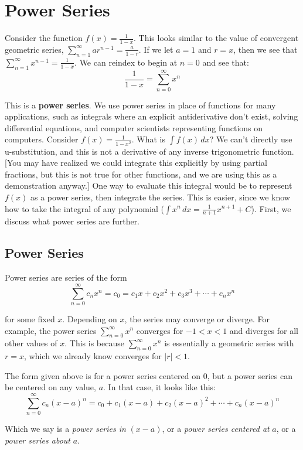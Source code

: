 \chapter{Power Series}

Consider the function $f(x) = \frac{1}{1-x}$. This looks similar to the value 
of convergent geometric series, $\sum_{n=1}^\infty ar^{n-1} = \frac{a}{1-r}$. 
If we let $a = 1$ and $r = x$, then we see that $\sum_{n=1}^\infty x^{n-1} = 
\frac{1}{1-x}$. We can reindex to begin at $n=0$ and see that:
$$\frac{1}{1-x} = \sum_{n=0}^\infty x^n$$

This is a \textbf{power series}. We use power series in place of functions for many 
applications, such as integrals where an explicit antiderivative don't exist, solving 
differential equations, and computer scientists representing functions on 
computers. Consider $f(x) = \frac{1}{1-x^2}$. What is $\int 
f(x)\,dx$? We can't directly use u-substitution, and this is not a derivative of 
any inverse trigonometric function. [You may have realized we could integrate 
this explicitly by using partial fractions, but this is not true for other 
functions, and we are using this as a demonstration anyway.] One way to 
evaluate this integral would be to represent $f(x)$ as a power series, then 
integrate the series. This is easier, since we know how to take the integral 
of any polynomial ($\int x^n\,dx = \frac{1}{n+1}x^{n+1} + C$). First, we 
discuss what power series are further.

\section{Power Series}
Power series are series of the form 
$$\sum_{n=0}^\infty c_n x^n = c_0 = c_1 x + c_2 x^2 + c_3 x^3 + \cdots + c_n 
x^n$$

for some fixed $x$. Depending on $x$, the series may converge or diverge. For 
example, the power series $\sum_{n=0}^\infty x^n$ converges for $ -1 < x < 1$ 
and diverges for all other values of $x$. This is because $\sum_{n=0}^\infty 
x^n$ is essentially a geometric series with $r = x$, which we already know 
converges for $|r|<1$. 

The form given above is for a power series centered on $0$, but a power series 
can be centered on any value, $a$. In that case, it looks like this:
$$\sum_{n=0}^\infty c_n (x - a)^n = c_0 + c_1(x - a) + c_2(x - a)^2 + \cdots + 
c_n(x - a)^n$$

Which we say is a \textit{power series in }$(x - a)$, or a \textit{power 
series centered at }$a$, or a \textit{power series about }$a$. 

